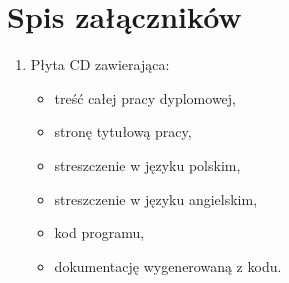 \documentclass[a4paper,11pt,twoside]{report}
\theoremstyle{definition}
\begin{document}
\thispagestyle{empty}

\listoffigures
\thispagestyle{empty}


\renewcommand{\listtablename}{Spis tabel}
\listoftables
\thispagestyle{empty}



\chapter*{Spis załączników}
\begin{enumerate}
\item Płyta CD zawierająca:
\begin{itemize}
	\item treść całej pracy dyplomowej,
	\item stronę tytułową pracy,
	\item streszczenie w języku polskim,
	\item streszczenie w języku angielskim,
	\item kod programu,
	\item dokumentację wygenerowaną z kodu.
\end{itemize}
\end{enumerate}
\thispagestyle{empty}
\end{document}
